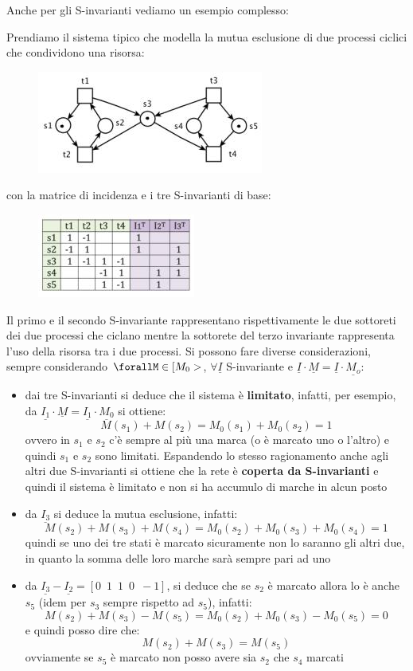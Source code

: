 \documentclass[a4paper,12pt, oneside]{book}
\begin{document}
Anche per gli S-invarianti vediamo un esempio complesso:
\begin{esempio}
  Prendiamo il sistema tipico che modella la mutua esclusione di due processi
  ciclici che condividono una risorsa: 
  \begin{figure}[H]
    \centering
    \includegraphics[scale = 0.8]{img/si9.jpg}
  \end{figure}
  \newpage
  con la matrice di incidenza e i tre S-invarianti di base:
  \begin{figure}[H]
    \centering
    \includegraphics[scale = 0.8]{img/si10.jpg}
  \end{figure}
  Il primo e il secondo S-invariante rappresentano rispettivamente le due
  sottoreti dei due processi che ciclano mentre la sottorete del terzo
  invariante rappresenta l'uso della risorsa tra i due processi. Si possono fare
  diverse considerazioni, sempre considerando $\forallM\in[M_0>$,
  $\forall\underline{I}$ S-invariante e
  $\underline{I}\cdot\underline{M}=\underline{I}\cdot \underline{M_o}$:
  \begin{itemize}
    \item dai tre S-invarianti si deduce che il sistema è \textbf{limitato},
    infatti, per esempio, da
    $\underline{I_1}\cdot\underline{M}=\underline{I_1}\cdot\underline{M_0}$ si
    ottiene:
    \[M(s_1)+M(s_2)=M_0(s_1)+M_0(s_2)=1\]
    ovvero in $s_1$ e $s_2$ c'è sempre al più una marca (o è marcato uno o
    l'altro) e quindi $s_1$ e $s_2$ sono limitati. Espandendo lo stesso
    ragionamento anche agli altri due S-invarianti si ottiene che la
    rete è \textbf{coperta da S-invarianti} e quindi il sistema è limitato e
    non si ha accumulo di marche in alcun posto
    \item da $\underline{I_3}$ si deduce la mutua esclusione, infatti:
    \[M(s_2)+M(s_3)+M(s_4)=M_0(s_2)+M_0(s_3)+M_0(s_4)=1\]
    quindi se uno dei tre stati è marcato sicuramente non lo saranno gli altri
    due, in quanto la somma delle loro marche sarà sempre pari ad uno
    \item da $\underline{I_3}-\underline{I_2}=[0\,\,\,1\,\,\,1\,\,\,0\,\,\,-1]$,
    si deduce che se $s_2$ è marcato allora lo è anche $s_5$ (idem per $s_3$
    sempre rispetto ad $s_5$), infatti:
    \[M(s_2)+M(s_3)-M(s_5)=M_0(s_2)+M_0(s_3)-M_0(s_5)=0\]
    e quindi posso dire che:
    \[M(s_2)+M(s_3)=M(s_5)\]
    ovviamente se $s_5$ è marcato non posso avere sia $s_2$ che $s_4$ marcati
  \end{itemize}
\end{esempio}
\end{document}
